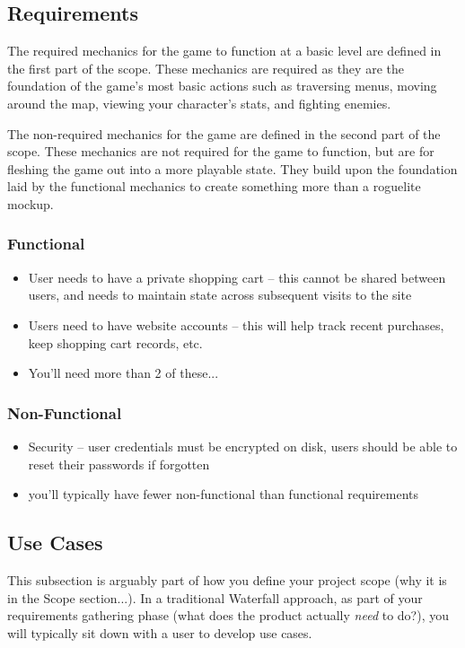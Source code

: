 \documentclass[10pt,conference,onecolumn,compsoc]{IEEEtran}
\begin{document}
\subsection{Requirements}
The required mechanics for the game to function at a basic level are defined in the first part of the scope. These mechanics are required as they are the foundation of the game's most basic actions such as traversing menus, moving around the map, viewing your character's stats, and fighting enemies.

The non-required mechanics for the game are defined in the second part of the scope. These mechanics are not required for the game to function, but are for fleshing the game out into a more playable state. They build upon the foundation laid by the functional mechanics to create something more than a roguelite mockup.


\subsubsection{Functional}
\begin{itemize}
\item User needs to have a private shopping cart -- this cannot be shared between users, and needs to maintain state across subsequent visits to the site
\item Users need to have website accounts -- this will help track recent purchases, keep shopping cart records, etc.
\item You'll need more than 2 of these...
\end{itemize}

\subsubsection{Non-Functional}
\begin{itemize}
\item Security -- user credentials must be encrypted on disk, users should be able to reset their passwords if forgotten
\item you'll typically have fewer non-functional than functional requirements
\end{itemize}

\subsection{Use Cases}
This subsection is arguably part of how you define your project scope (why it is in the Scope section...).  In a traditional Waterfall approach, as part of your requirements gathering phase (what does the product actually \emph{need} to do?), you will typically sit down with a user to develop use cases.
\end{document}
